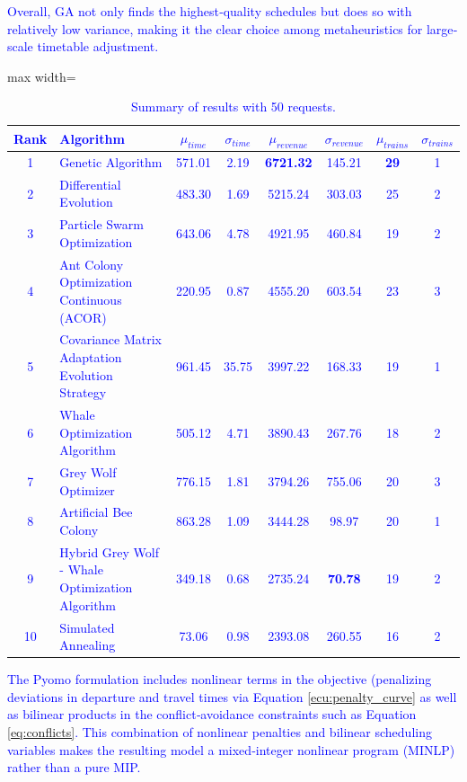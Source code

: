 \documentclass[Afour,sagev,times]{sagej}
\newcommand{\primero}[1]{\textcolor{blue}{#1}}
\begin{document}
\primero{
Overall, GA not only finds the highest‐quality schedules but does so with relatively low variance, making it the clear choice among metaheuristics for large‐scale timetable adjustment.  
}

\begin{table}[htbp]
\centering
\caption{Summary of results with 50 requests.}
\begin{adjustbox}{max width=\textwidth}
\primero{
\begin{tabular}{|c|l|c|c|c|c|c|c|}
\hline
\textbf{Rank} & \textbf{Algorithm} & \(\mu_{time}\) & \(\sigma_{time}\) & \(\mu_{revenue}\) & \(\sigma_{revenue}\) & \(\mu_{trains}\) & \(\sigma_{trains}\) \\ \hline \hline
1 & Genetic Algorithm                                     & 571.01 &   2.19 & \textbf{6721.32} & 145.21 & \textbf{29} & 1 \\ \hline
2 & Differential Evolution                                 & 483.30 &   1.69 & 5215.24 & 303.03 & 25 & 2 \\ \hline
3 & Particle Swarm Optimization                            & 643.06 &   4.78 & 4921.95 & 460.84 & 19 & 2 \\ \hline
4 & Ant Colony Optimization Continuous (ACOR)              & 220.95 &   0.87 & 4555.20 & 603.54 & 23 & 3 \\ \hline
5 & Covariance Matrix Adaptation Evolution Strategy        & 961.45 &  35.75 & 3997.22 & 168.33 & 19 & 1 \\ \hline
6 & Whale Optimization Algorithm                           & 505.12 &   4.71 & 3890.43 & 267.76 & 18 & 2 \\ \hline
7 & Grey Wolf Optimizer                                    & 776.15 &   1.81 & 3794.26 & 755.06 & 20 & 3 \\ \hline
8 & Artificial Bee Colony                                  & 863.28 &   1.09 & 3444.28 &  98.97 & 20 & 1 \\ \hline
9 & Hybrid Grey Wolf - Whale Optimization Algorithm        & 349.18 &   0.68 & 2735.24 &  \textbf{70.78} & 19 & 2 \\ \hline
10 & Simulated Annealing                                   &  73.06 &   0.98 & 2393.08 & 260.55 & 16 & 2 \\ \hline
\end{tabular}
}
\end{adjustbox}
\label{tab:summary_results_50}
\end{table}

\primero{
The Pyomo formulation includes nonlinear terms in the objective (penalizing deviations in departure and travel times via Equation \ref{ecu:penalty_curve} as well as bilinear products in the conflict‐avoidance constraints such as Equation \ref{eq:conflicts}. This combination of nonlinear penalties and bilinear scheduling variables makes the resulting model a mixed‐integer nonlinear program (MINLP) rather than a pure MIP.
}
\end{document}
